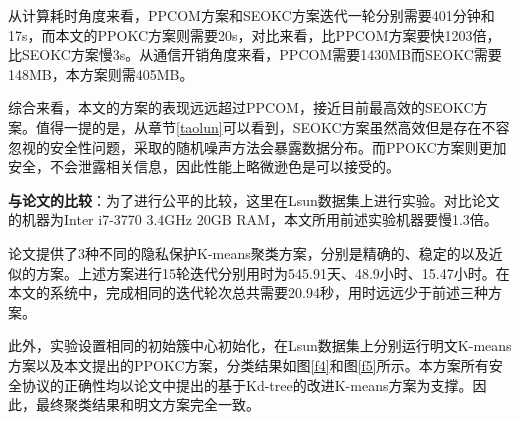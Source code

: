 \begin{table}[htbp]
	\centering
	\renewcommand{\arraystretch}{1.3} %
	\caption{通信与计算开销对比($n=8192,m=5,k=3$)}
	\label{s3-ta-duibi}
\end{table}
从计算耗时角度来看，PPCOM方案和SEOKC方案迭代一轮分别需要401分钟和17s，而本文的PPOKC方案则需要20s，对比来看，比PPCOM方案要快1203倍，比SEOKC方案慢3s。从通信开销角度来看，PPCOM需要1430MB而SEOKC需要148MB，本方案则需405MB。

综合来看，本文的方案的表现远远超过PPCOM，接近目前最高效的SEOKC方案。值得一提的是，从章节\ref{taolun}可以看到，SEOKC方案虽然高效但是存在不容忽视的安全性问题，采取的随机噪声方法会暴露数据分布。而PPOKC方案则更加安全，不会泄露相关信息，因此性能上略微逊色是可以接受的。

\textbf{与论文\cite{jaschke2019unsupervised}的比较}：为了进行公平的比较，这里在Lsun数据集上进行实验。对比论文的机器为Inter i7-3770 3.4GHz 20GB RAM，本文所用前述实验机器要慢1.3倍。

论文\cite{jaschke2019unsupervised}提供了3种不同的隐私保护K-means聚类方案，分别是精确的、稳定的以及近似的方案。上述方案进行15轮迭代分别用时为545.91天、48.9小时、15.47小时。在本文的系统中，完成相同的迭代轮次总共需要20.94秒，用时远远少于前述三种方案。

此外，实验设置相同的初始簇中心初始化，在Lsun数据集上分别运行明文K-means方案以及本文提出的PPOKC方案，分类结果如图\ref{f4}和图\ref{f5}所示。本方案所有安全协议的正确性均以论文\cite{kanungo2002efficient}中提出的基于Kd-tree的改进K-means方案为支撑。因此，最终聚类结果和明文方案完全一致。

